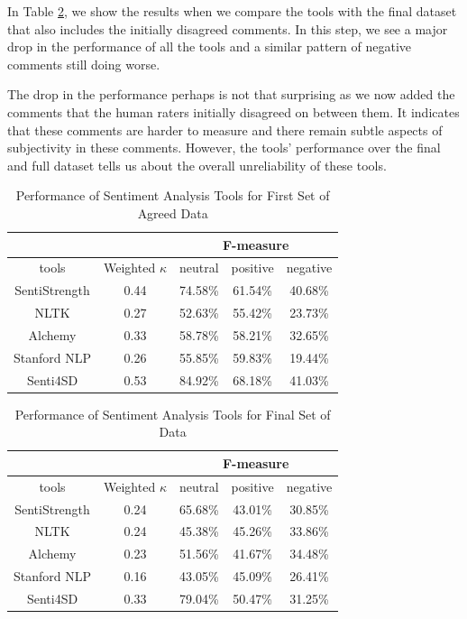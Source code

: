 In Table \ref{sentfinal}, we show the results when we compare the tools with the final dataset that also includes the initially disagreed comments. In this step, we see a major drop in the performance of all the tools and a similar pattern of negative comments still doing worse.

The drop in the performance perhaps is not that surprising as we now added the comments that the human raters initially disagreed on between them. It indicates that these comments are harder to measure and there remain subtle aspects of subjectivity in these comments. However, the tools' performance over the final and full dataset tells us about the overall unreliability of these tools.


\vspace{3mm}
\noindent{}

\begin{table}
\centering
\caption{Performance of Sentiment Analysis Tools for First Set of  Agreed Data}
\label{sentfirst}
\begin{tabular}{|c|c|c|c|c|}
\hline
\multicolumn{2}{|c|}{ } & \multicolumn{3}{c|}{ F-measure } \\
\hline
tools & Weighted $\kappa$ & neutral & positive & negative \\
\hline
SentiStrength & 0.44 & 74.58\% & 61.54\% & 40.68\% \\
\hline
NLTK & 0.27 & 52.63\% & 55.42\% & 23.73\% \\
\hline
Alchemy & 0.33 & 58.78\% & 58.21\% & 32.65\% \\
\hline
Stanford NLP & 0.26 & 55.85\% & 59.83\% & 19.44\% \\
\hline
Senti4SD & 0.53 & 84.92\% & 68.18\% & 41.03\% \\
\hline
\end{tabular}
\end{table}

\begin{table}
\centering
\caption{Performance of Sentiment Analysis Tools for Final Set of Data}
\label{sentfinal}
\begin{tabular}{|c|c|c|c|c|}
\hline
\multicolumn{2}{|c|}{ } & \multicolumn{3}{c|}{ F-measure } \\
\hline
tools & Weighted $\kappa$ & neutral & positive & negative \\
\hline
SentiStrength & 0.24 & 65.68\% & 43.01\% & 30.85\% \\
\hline
NLTK & 0.24 & 45.38\% & 45.26\% & 33.86\% \\
\hline
Alchemy & 0.23 & 51.56\% & 41.67\% & 34.48\% \\
\hline
Stanford NLP & 0.16 & 43.05\% & 45.09\% & 26.41\% \\
\hline
Senti4SD & 0.33 & 79.04\% & 50.47\% &  31.25\% \\
\hline
\end{tabular}
\end{table}

